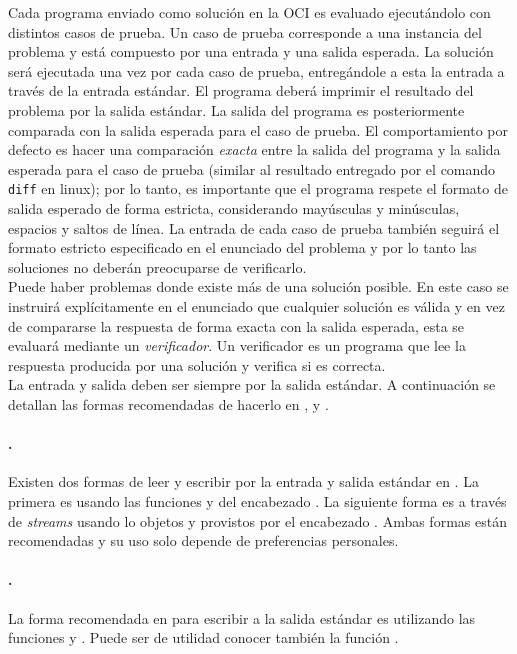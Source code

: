 Cada programa enviado como solución en la OCI es evaluado ejecutándolo con
distintos casos de prueba.
Un caso de prueba corresponde a una instancia del problema y está compuesto por
una entrada y una salida esperada.
La solución será ejecutada una vez por cada caso de prueba, entregándole a esta
la entrada a través de la entrada estándar.
El programa deberá imprimir el resultado del problema por la salida estándar.
La salida del programa es posteriormente comparada con la salida esperada para
el caso de prueba.
El comportamiento por defecto es hacer una comparación \textit{exacta} entre la
salida del programa y la salida esperada para el caso de prueba (similar al
resultado entregado por el comando \verb|diff| en linux);
 por lo tanto, es importante que el programa respete el formato de salida esperado
de forma estricta, considerando mayúsculas y minúsculas, espacios y saltos de
línea.
La entrada de cada caso de prueba también seguirá el formato estricto
especificado en el enunciado del problema y por lo tanto las soluciones no
deberán preocuparse de verificarlo.\\

Puede haber problemas donde existe más de una solución posible.
En este caso se instruirá explícitamente en el enunciado que cualquier solución
es válida y en vez de compararse la respuesta de forma exacta con la salida
esperada, esta se evaluará mediante un \emph{verificador}.
Un verificador es un programa que lee la respuesta producida por una solución y
verifica si es correcta.\\

La entrada y salida deben ser siempre por la salida estándar.
A continuación se detallan las formas recomendadas de hacerlo en {\new \java, \cpp y \python}.
\paragraph{\cpp.} Existen dos formas de leer y escribir por la entrada y salida
  estándar en \cpp.
  La primera es usando las funciones  y  del encabezado
  .
  La siguiente forma es a través de \textit{streams} usando lo objetos
   y  provistos por el encabezado .
  Ambas formas están recomendadas y su uso solo depende de preferencias personales.
\paragraph{\java.} La forma recomendada en \java para escribir a la salida estándar es
  utilizando las funciones  y .
  Puede ser de utilidad conocer también la función .

